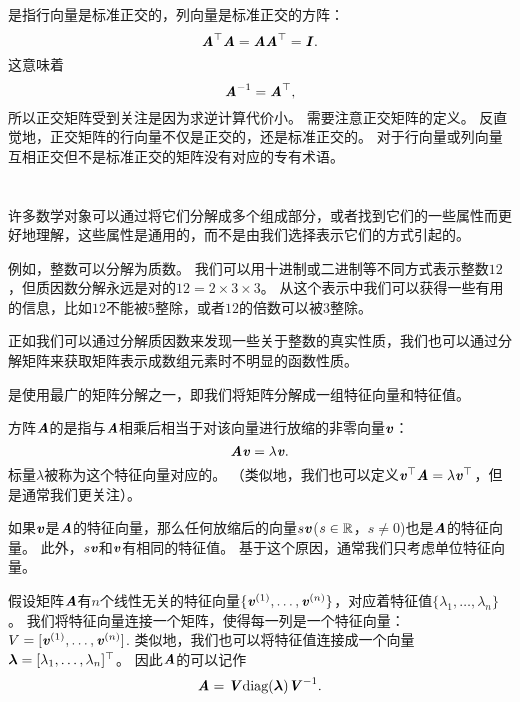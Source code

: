 是指行向量是标准正交的，列向量是标准正交的方阵：
\begin{equation}
    \MA^\top\MA=\MA\MA^\top=\MI.
\end{equation}
这意味着 
\begin{equation}
    \MA^{-1}=\MA^\top,
\end{equation}
所以正交矩阵受到关注是因为求逆计算代价小。
需要注意正交矩阵的定义。
反直觉地，正交矩阵的行向量不仅是正交的，还是标准正交的。
对于行向量或列向量互相正交但不是标准正交的矩阵没有对应的专有术语。




\section{}
\label{sec:eigendecomposition}

许多数学对象可以通过将它们分解成多个组成部分，或者找到它们的一些属性而更好地理解，这些属性是通用的，而不是由我们选择表示它们的方式引起的。


例如，整数可以分解为质数。
我们可以用十进制或二进制等不同方式表示整数$12$，但质因数分解永远是对的$12=2\times 3\times 3$。
从这个表示中我们可以获得一些有用的信息，比如$12$不能被$5$整除，或者$12$的倍数可以被$3$整除。


正如我们可以通过分解质因数来发现一些关于整数的真实性质，我们也可以通过分解矩阵来获取矩阵表示成数组元素时不明显的函数性质。


是使用最广的矩阵分解之一，即我们将矩阵分解成一组特征向量和特征值。


方阵$\MA$的是指与$\MA$相乘后相当于对该向量进行放缩的非零向量$\Vv$：
\begin{equation}
    \MA\Vv=\lambda \Vv.
\end{equation}
标量$\lambda$被称为这个特征向量对应的。
（类似地，我们也可以定义$\Vv^\top\MA=\lambda \Vv^\top$，但是通常我们更关注）。


如果$\Vv$是$\MA$的特征向量，那么任何放缩后的向量$s\Vv$($s\in \SetR$，$s\neq 0$)也是$\MA$的特征向量。
此外，$s\Vv$和$\Vv$有相同的特征值。
基于这个原因，通常我们只考虑单位特征向量。


假设矩阵$\MA$有$n$个线性无关的特征向量$\{\Vv^{(1)}, \dots, \Vv^{(n)}\}$，对应着特征值$\{\lambda_1, \dots , \lambda_n \}$。
我们将特征向量连接一个矩阵，使得每一列是一个特征向量：$V=[\Vv^{(1)}, \dots, \Vv^{(n)}]$.
类似地，我们也可以将特征值连接成一个向量$\Vlambda = [\lambda_1, \dots , \lambda_n]^\top$。
因此$\MA$的可以记作
\begin{equation}
    \MA = \MV \text{diag}(\mathbf{\Vlambda}) \MV^{-1}.
\end{equation}


